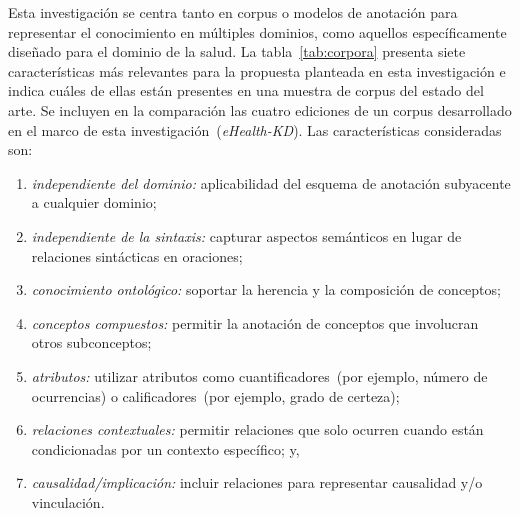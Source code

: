 Esta investigación se centra tanto en corpus o modelos de anotación para representar el conocimiento en múltiples dominios, como aquellos específicamente diseñado para el dominio de la salud.
La tabla~\ref{tab:corpora} presenta siete características más relevantes para la propuesta planteada en esta investigación e indica cuáles de ellas están presentes en una muestra de corpus del estado del arte.
Se incluyen en la comparación las cuatro ediciones de un corpus desarrollado en el marco de esta investigación~(\textit{eHealth-KD}).
Las características consideradas son:
\begin{enumerate}
\item \textit{independiente del dominio:} aplicabilidad del esquema de anotación subyacente a cualquier dominio;
\item \textit{independiente de la sintaxis:} capturar aspectos semánticos en lugar de relaciones sintácticas en oraciones;
\item \textit{conocimiento ontológico:} soportar la herencia y la composición de conceptos;
\item \textit{conceptos compuestos:} permitir la anotación de conceptos que involucran otros subconceptos;
\item \textit{atributos:} utilizar atributos como cuantificadores~(por ejemplo, número de ocurrencias) o calificadores~(por ejemplo, grado de certeza);
\item \textit{relaciones contextuales:} permitir relaciones que solo ocurren cuando están condicionadas por un contexto específico; y,
\item \textit{causalidad/implicación:} incluir relaciones para representar causalidad y/o vinculación.
\end{enumerate}

\newcommand{\ok}{\checkmark}
\newcommand{\ap}{\ensuremath{\approx}}

